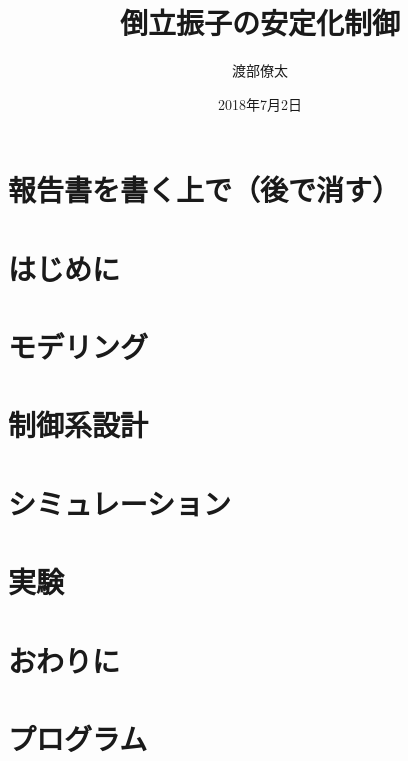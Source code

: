 \documentclass[a4j , 11pt , twoside]{jbook}
\begin{document}
\title{倒立振子の安定化制御}
\author{渡部僚太}
\date{2018年7月2日}
\maketitle
\tableofcontents %
\listoffigures %
\listoftables %
\cleardoublepage %
\chapter{報告書を書く上で（後で消す）}
	
\chapter{はじめに}
	
\chapter{モデリング}
	
\chapter{制御系設計}
	
\chapter{シミュレーション}
	
\chapter{実験}
	
\chapter{おわりに}
	



\appendix
\chapter{プログラム}
	
\end{document}
